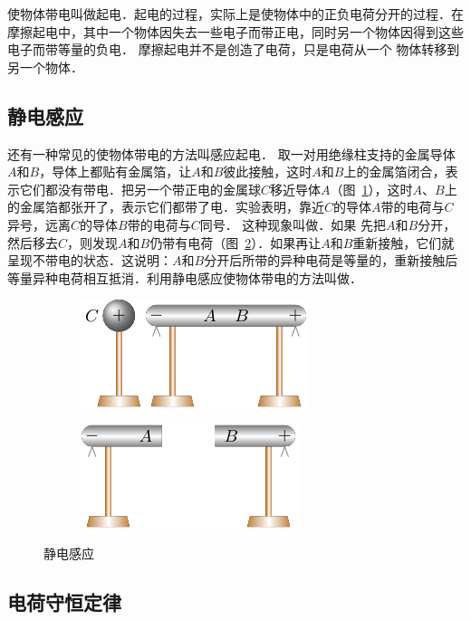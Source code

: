 使物体带电叫做起电．起电的过程，实际上是使物体中的正负电荷分开的过程．在摩擦起电中，其中一个物体因失去一些电子而带正电，同时另一个物体因得到这些电子而带等量的负电．
摩擦起电并不是创造了电荷，只是电荷从一个
物体转移到另一个物体．

\subsection{静电感应} 

还有一种常见的使物体带电的方法叫感应起电．
取一对用绝缘柱支持的金属导体$A$和$B$，导体上都贴有金属箔，让$A$和$B$彼此接触，这时$A$和$B$上的金属箔闭合，表示它们都没有带电．把另一个带正电的金属球$C$移近导体$A$（图~\ref{fig_B_6-2a}），这时$A$、$B$上的金属箔都张开了，表示它们都带了电．实验表明，靠近$C$的导体$A$带的电荷与$C$异号，远离$C$的导体$B$带的电荷与$C$同号．
这种现象叫做．如果
先把$A$和$B$分开，然后移去$C$，则发现$A$和$B$仍带有电荷（图~\ref{fig_B_6-2b}）．如果再让$A$和$B$重新接触，它们就呈现不带电的状态．这说明：$A$和$B$分开后所带的异种电荷是等量的，重新接触后等量异种电荷相互抵消．利用静电感应使物体带电的方法叫做．


\begin{figure}[htbp]
	\centering
	\begin{subfigure}{0.4\linewidth}
		\centering
		\includegraphics{fig/B/6-2a.pdf}
		\caption{}\label{fig_B_6-2a}
	\end{subfigure}
	\hfil
	\begin{subfigure}{0.4\linewidth}
		\centering
		\includegraphics{fig/B/6-2b.pdf}
		\caption{}\label{fig_B_6-2b}
	\end{subfigure}
	\caption{静电感应}\label{fig_B_6-2}
\end{figure}




\subsection{电荷守恒定律} 

